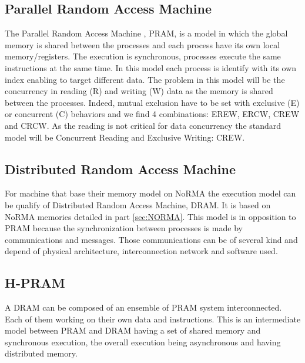 \subsection{Parallel Random Access Machine}
The Parallel Random Access Machine \cite{fortune1978parallelism}, PRAM, is a model in which the global memory is shared between the processes and each process have its own local memory/registers.
The execution is synchronous, processes execute the same instructions at the same time. 
In this model each process is identify with its own index enabling to target different data. 
The problem in this model will be the concurrency in reading (R) and writing (W) data as the memory is shared between the processes.
Indeed, mutual exclusion have to be set with exclusive (E) or concurrent (C) behaviors and we find 4 combinations: EREW, ERCW, CREW and CRCW.
As the reading is not critical for data concurrency the standard model will be Concurrent Reading and Exclusive Writing: CREW.

\subsection{Distributed Random Access Machine}
For machine that base their memory model on NoRMA the execution model can be qualify of Distributed Random Access Machine, DRAM.
It is based on NoRMA memories detailed in part \ref{sec:NORMA}.
This model is in opposition to PRAM because the synchronization between processes is made by communications and messages. 
Those communications can be of several kind and depend of physical architecture, interconnection network and software used.

\subsection{H-PRAM}
A DRAM can be composed of an ensemble of PRAM system interconnected. 
Each of them working on their own data and instructions. 
This is an intermediate model between PRAM and DRAM having a set of shared memory and synchronous execution, the overall execution being asynchronous and having distributed memory.

